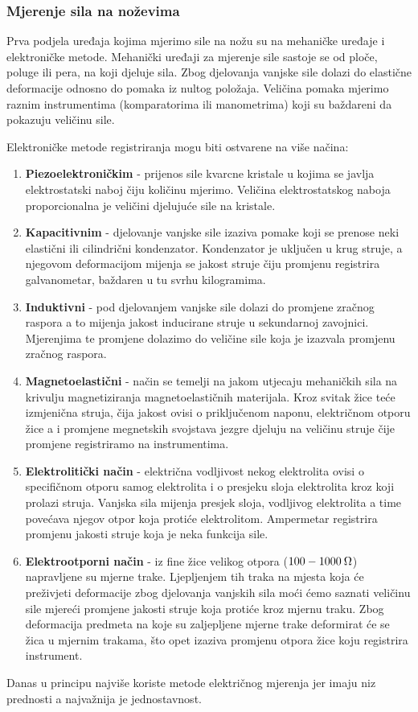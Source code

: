 \documentclass[a4paper,12pt]{article}
\numberwithin{figure}{section}
\begin{document}
\subsubsection{Mjerenje sila na noževima}
Prva podjela uređaja kojima mjerimo sile na nožu su na mehaničke uređaje i elektroničke metode. Mehanički uređaji za mjerenje sile sastoje se od ploče, poluge ili pera, na koji djeluje sila. Zbog djelovanja vanjske sile dolazi do elastične deformacije odnosno do pomaka iz nultog položaja. Veličina pomaka mjerimo raznim instrumentima (komparatorima ili manometrima) koji su baždareni da pokazuju veličinu sile.\par
Elektroničke metode registriranja mogu biti ostvarene na više načina:
\begin{enumerate}
\item \textbf{Piezoelektroničkim} - prijenos sile kvarcne kristale u kojima se javlja elektrostatski naboj čiju količinu mjerimo. Veličina elektrostatskog naboja proporcionalna je veličini djelujuće sile na kristale.
\item \textbf{Kapacitivnim} - djelovanje vanjske sile izaziva pomake koji se prenose neki elastični ili cilindrični kondenzator. Kondenzator je uključen u krug struje, a njegovom deformacijom mijenja se jakost struje čiju promjenu registrira galvanometar, baždaren u tu svrhu kilogramima.
\item \textbf{Induktivni} - pod djelovanjem vanjske sile dolazi do promjene zračnog raspora a to mijenja jakost inducirane struje u sekundarnoj zavojnici. Mjerenjima te promjene dolazimo do veličine sile koja je izazvala promjenu zračnog raspora.
\item \textbf{Magnetoelastični} - način se temelji na jakom utjecaju mehaničkih sila na krivulju magnetiziranja magnetoelastičnih materijala. Kroz svitak žice teće izmjenična struja, čija jakost ovisi o priključenom naponu, električnom otporu žice a i promjene megnetskih svojstava jezgre djeluju na veličinu struje čije promjene registriramo na instrumentima.
\item \textbf{Elektrolitički način} - električna vodljivost nekog elektrolita ovisi o specifičnom otporu samog elektrolita i o presjeku sloja elektrolita kroz koji prolazi struja. Vanjska sila mijenja presjek sloja, vodljivog elektrolita a time povećava njegov otpor koja protiće elektrolitom. Ampermetar registrira promjenu jakosti struje koja je neka funkcija sile.
\item \textbf{Elektrootporni način} - iz fine žice velikog otpora ($100 - 1000\:\ohm$) napravljene su mjerne trake. Ljepljenjem tih traka na mjesta koja će preživjeti deformacije zbog djelovanja vanjskih sila moći ćemo saznati veličinu sile mjereći promjene jakosti struje koja protiće kroz mjernu traku. Zbog deformacija predmeta na koje su zaljepljene mjerne trake deformirat će se žica u mjernim trakama, što opet izaziva promjenu otpora žice koju registrira instrument. 
\end{enumerate}
Danas u principu najviše koriste metode električnog mjerenja jer imaju niz  prednosti a najvažnija je jednostavnost.
\end{document}
